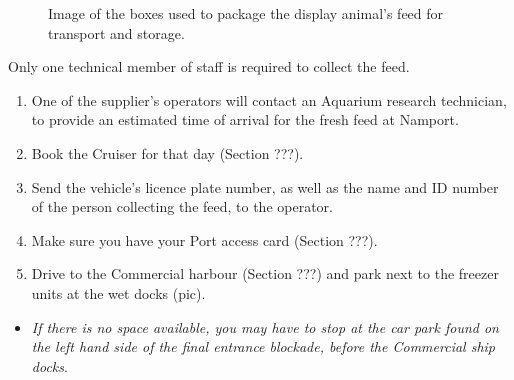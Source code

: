 \documentclass[
  12pt,
]{report}
\providecommand{\tightlist}{%
  \setlength{\itemsep}{0pt}\setlength{\parskip}{0pt}}\usepackage{longtable,booktabs,array}
\begin{document}
\begin{figure}[H]

\begin{minipage}[t]{0.50\linewidth}

{\centering 


}

\end{minipage}%
%
\begin{minipage}[t]{0.50\linewidth}

{\centering 


}

\end{minipage}%

\caption{\label{fig-feed-boxes}Image of the boxes used to package the
display animal's feed for transport and storage.}

\end{figure}

{Only one technical member of staff is required to collect the feed}.

\begin{enumerate}
\def\labelenumi{\arabic{enumi}.}
\tightlist
\item
  One of the supplier's operators will contact an Aquarium research
  technician, to provide an estimated time of arrival for the fresh feed
  at Namport.
\item
  Book the Cruiser for that day (Section ???).
\item
  Send the vehicle's licence plate number, as well as the name and ID
  number of the person collecting the feed, to the operator.
\item
  Make sure you have your Port access card (Section ???).
\item
  Drive to the Commercial harbour (Section ???) and park next to the
  freezer units at the wet docks (pic).
\end{enumerate}

\begin{itemize}
\tightlist
\item
  \emph{If there is no space available, you may have to stop at the car
  park found on the left hand side of the final entrance blockade,
  before the Commercial ship docks}.
\end{itemize}
\end{document}
